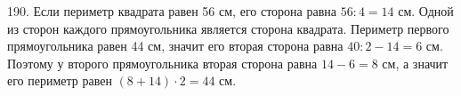 190. Если периметр квадрата равен 56 см, его сторона равна $56:4=14$ см. Одной из сторон каждого прямоугольника является сторона квадрата. Периметр первого прямоугольника равен 44 см, значит его вторая сторона равна $40:2-14=6$ см. Поэтому у второго прямоугольника вторая сторона равна $14-6=8$ см, а значит его периметр равен $(8+14)\cdot2=44$ см.\\
